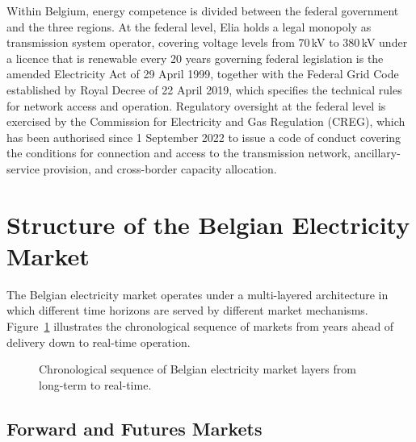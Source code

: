 Within Belgium, energy competence is divided between the federal government and the three regions. At the federal level, Elia holds a legal monopoly as transmission system operator, covering voltage levels from 70\,kV to 380\,kV under a licence that is renewable every 20 years governing federal legislation is the amended Electricity Act of 29 April 1999, together with the Federal Grid Code established by Royal Decree of 22 April 2019, which specifies the technical rules for network access and operation. Regulatory oversight at the federal level is exercised by the Commission for Electricity and Gas Regulation (CREG), which has been authorised since 1 September 2022 to issue a code of conduct covering the conditions for connection and access to the transmission network, ancillary-service provision, and cross-border capacity allocation.
\section{Structure of the Belgian Electricity Market}

The Belgian electricity market operates under a multi-layered architecture in which different time horizons are served by different market mechanisms. Figure~\ref{fig:market-timeline} illustrates the chronological sequence of markets from years ahead of delivery down to real-time operation.

\begin{figure}[h]
    \centering
    \caption{Chronological sequence of Belgian electricity market layers from long-term to real-time.}
    \label{fig:market-timeline}
\end{figure}

\subsection{Forward and Futures Markets}

